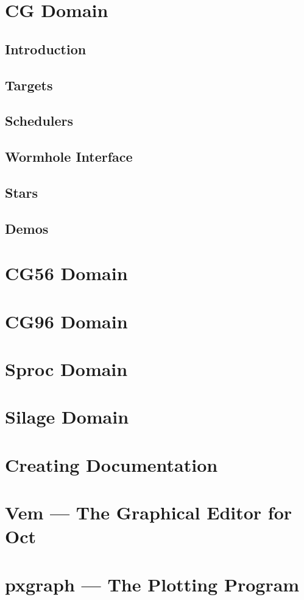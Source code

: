 \cleardoublepage
{}

\chapter{CG Domain}
\label{CG.Domain}

\section{Introduction}
\label{CG.Introduction}

\cleardoublepage
\section{Targets}
\label{CG.Targets}

\section{Schedulers}
\label{CG.Schedulers}

\section{Wormhole Interface}
\label{CG.Wormhole.Interface}

\section{Stars}
\label{CG.Star.Overview}

\section{Demos}
\label{CG.Demo.Overview}

\cleardoublepage
{}

\chapter{CG56 Domain}
\label{CG56.Domain}

\chapter{CG96 Domain}
\label{CG96.Domain}

\chapter{Sproc Domain}
\label{Sproc.Domain}

\chapter{Silage Domain}
\label{Silage.Domain}

\chapter{Creating Documentation}
\label{Creating.Documentation}

\chapter{Vem --- The Graphical Editor for Oct}
\label{Vem:The.Graphical.Editor.for.Oct}

\chapter{pxgraph --- The Plotting Program}
\label{pxgraph:The.Plotting.Program}
